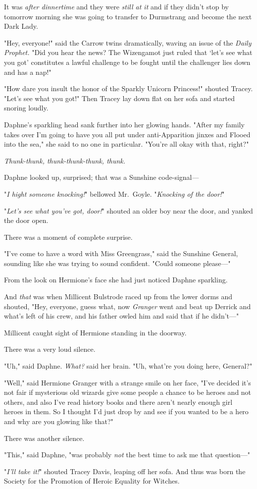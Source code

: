 It was \emph{after dinnertime} and they were \emph{still at it} and if they 
didn't stop by tomorrow morning she was going to transfer to Durmstrang and 
become the next Dark Lady.

"Hey, everyone!" said the Carrow twins dramatically, waving an issue of the 
\emph{Daily Prophet.} "Did you hear the news? The Wizengamot just ruled that 
`let's see what you got' constitutes a lawful challenge to be fought until the 
challenger lies down and has a nap!"

"How dare you insult the honor of the Sparkly Unicorn Princess!" shouted 
Tracey. "Let's see what you got!" Then Tracey lay down flat on her sofa and 
started snoring loudly.

Daphne's sparkling head sank further into her glowing hands. "After my family 
takes over I'm going to have you all put under anti-Apparition jinxes and 
Flooed into the sea," she said to no one in particular. "You're all okay with 
that, right?"

\emph{Thunk-thunk, thunk-thunk-thunk, thunk.}

Daphne looked up, surprised; that was a Sunshine code-signal---

"\emph{I hight someone knocking!}" bellowed Mr.~Goyle. "\emph{Knocking of the 
door!}"

"\emph{Let's see what you've got, door!}" shouted an older boy near the door, 
and yanked the door open.

There was a moment of complete surprise.

"I've come to have a word with Miss Greengrass," said the Sunshine General, 
sounding like she was trying to sound confident. "Could someone please---"

From the look on Hermione's face she had just noticed Daphne sparkling.

And \emph{that} was when Millicent Bulstrode raced up from the lower dorms and 
shouted, "Hey, everyone, guess what, now \emph{Granger} went and beat up 
Derrick and what's left of his crew, and his father owled him and said that if 
he didn't---"

Millicent caught sight of Hermione standing in the doorway.

There was a very loud silence.

"Uh," said Daphne. \emph{What?} said her brain. "Uh, what're you doing here, 
General?"

"Well," said Hermione Granger with a strange smile on her face, "I've decided 
it's not fair if mysterious old wizards give some people a chance to be heroes 
and not others, and also I've read history books and there aren't nearly enough 
girl heroes in them. So I thought I'd just drop by and see if you wanted to be 
a hero and why are you glowing like that?"

There was another silence.

"This," said Daphne, "was probably \emph{not} the best time to ask me that 
question---"

"\emph{I'll take it!}" shouted Tracey Davis, leaping off her sofa.
\sbreak
And thus was born the Society for the Promotion of Heroic Equality for Witches.
